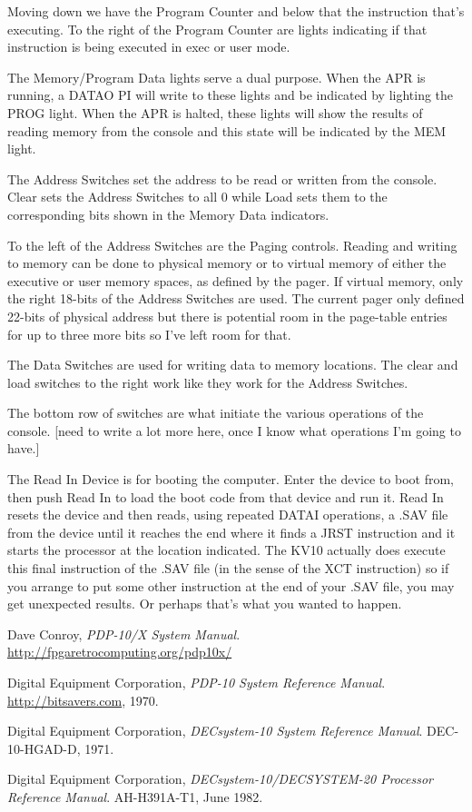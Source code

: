 \documentclass[12pt]{report}
\newcommand{\code}[1]{\textsf{#1}}
\begin{document}
Moving down we have the Program Counter and below that the instruction that's executing.
To the right of the Program Counter are lights indicating if that instruction is being
executed in exec or user mode.

The Memory/Program Data lights serve a dual purpose.  When the APR is running, a
\code{DATAO PI} will write to these lights and be indicated by lighting the PROG light.
When the APR is halted, these lights will show the results of reading memory from the
console and this state will be indicated by the MEM light.

The Address Switches set the address to be read or written from the console.  Clear sets
the Address Switches to all 0 while Load sets them to the corresponding bits shown in the
Memory Data indicators.

To the left of the Address Switches are the Paging controls.  Reading and writing to
memory can be done to physical memory or to virtual memory of either the executive or
user memory spaces, as defined by the pager.  If virtual memory, only the right 18-bits of
the Address Switches are used.  The current pager only defined 22-bits of physical address
but there is potential room in the page-table entries for up to three more bits so I've
left room for that.

The Data Switches are used for writing data to memory locations.  The clear and load
switches to the right work like they work for the Address Switches.

The bottom row of switches are what initiate the various operations of the console.  [need
  to write a lot more here, once I know what operations I'm going to have.]

The Read In Device is for booting the computer.  Enter the device to boot from, then push
Read In to load the boot code from that device and run it.  Read In resets the device and
then reads, using repeated DATAI operations, a .SAV file from the device until it reaches
the end where it finds a \code{JRST} instruction and it starts the processor at the
location indicated.  The KV10 actually does execute this final instruction of the .SAV
file (in the sense of the \code{XCT} instruction) so if you arrange to put some other
instruction at the end of your .SAV file, you may get unexpected results.  Or perhaps
that's what you wanted to happen.


\begin{thebibliography}{9}

  Dave Conroy,
  \emph{PDP-10/X System Manual}.
  \url{http://fpgaretrocomputing.org/pdp10x/}

  Digital Equipment Corporation,
  \emph{PDP-10 System Reference Manual}.
  \url{http://bitsavers.com},
  1970.

  Digital Equipment Corporation,
  \emph{DECsystem-10 System Reference Manual}.
  DEC-10-HGAD-D,
  1971.

  Digital Equipment Corporation,
  \emph{DECsystem-10/DECSYSTEM-20 Processor Reference Manual}.
  AH-H391A-T1,
  June 1982.

\end{thebibliography}
\end{document}
